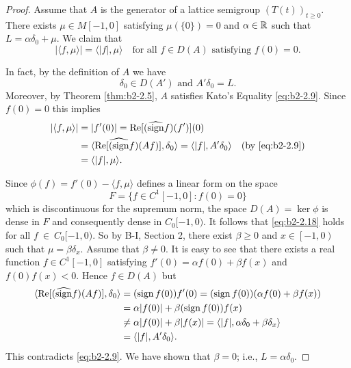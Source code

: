 \begin{proof}
Assume that $A$ is the generator of a lattice semigroup $(T(t))_{t \geq 0}$.
There exists $\mu \in M[-1,0]$ satisfying $\mu(\{0\}) = 0$ and $\alpha \in \mathbb{R}$ such that $L = \alpha\delta_{0} + \mu$.
We claim that
\begin{equation}\label{eq:b2-2.18}
|\langle f,\mu \rangle| = \langle |f|,\mu \rangle \quad \text{for all } f \in D(A) \text{ satisfying } f(0) = 0.
\end{equation}

In fact, by the definition of $A$ we have
\begin{equation}\label{eq:b2-2.19}
\delta_{0} \in D(A') \text{ and } A'\delta_{0} = L.
\end{equation}
Moreover, by Theorem \ref{thm:b2-2.5}, $A$ satisfies Kato's Equality \eqref{eq:b2-2.9}.
Since $f(0) = 0$ this implies
\begin{align*}
|\langle f,\mu \rangle| &= |f'(0)| = \mathop{}\!\mathrm{Re}[(\widehat{\operatorname{sign}} f)(f')](0) \\
&= \langle \mathop{}\!\mathrm{Re}[\widehat{(\operatorname{sign}} f)(Af)],\delta_{0} \rangle = \langle |f|,A'\delta_{0} \rangle \quad \text{(by \eqref{eq:b2-2.9})} \\
&= \langle |f|,\mu \rangle.
\end{align*}

Since $\phi(f) = f'(0) - \langle f,\mu \rangle$ defines a linear form on the space 
\[
F = \{f \in C^{1}[-1,0] : f(0) = 0\}
\]
 which is discontinuous for the supremum norm, the space $D(A) = \ker \phi$ is dense in $F$ and consequently dense in $C_{0}[-1,0)$.
It follows that \eqref{eq:b2-2.18} holds for all $f~\in~C_{0}[-1,0)$.
So by B-I, Section 2, there exist $\beta \geq 0$ and $x \in \left[-1,0\right)$ such that $\mu = \beta\delta_{x}$.
Assume that $\beta \neq 0$.
It is easy to see that there exists a real function $f \in C^{1}[-1,0]$ satisfying $f'(0) = \alpha f(0) + \beta f(x)$ and $f(0)f(x) < 0$.
Hence $f \in D(A)$ but 
\begin{align*}
\langle \mathop{}\!\mathrm{Re}[(\widehat{\operatorname{sign}} f)(Af)],\delta_{0} \rangle 
	&= (\operatorname{sign} f(0))f'(0) 
	= (\operatorname{sign} f(0))(\alpha f(0) + \beta f(x))\\
	&= \alpha|f(0)| + \beta(\operatorname{sign} f(0))f(x) \\
	&\neq \alpha|f(0)| + \beta|f(x)| 
	= \langle |f|, \alpha\delta_{0} + \beta\delta_{x} \rangle \\ 
	&= \langle |f|,A'\delta_{0} \rangle.
\end{align*}
This contradicts \eqref{eq:b2-2.9}.
We have shown that $\beta = 0$; i.e., $L = \alpha\delta_{0}$.


\end{proof}
